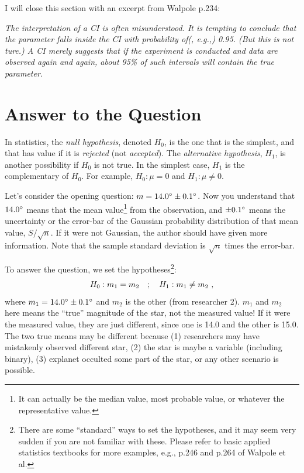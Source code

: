 I will close this section with an excerpt from Walpole p.234:

\textit{The interpretation of a CI is often misunderstood. It is tempting to conclude that the parameter falls inside the CI with probability of(, e.g.,) 0.95. (But this is not ture.) A CI merely suggests that if the experiment is conducted and data are observed again and again, about 95\% of such intervals will contain the true parameter.}



\section{Answer to the Question}
In statistics, the \textit{null hypothesis}, denoted $ H_0 $, is the one that is the simplest, and that has value if it is \textit{rejected} (not \textit{accepted}). The \textit{alternative hypothesis}, $ H_1 $, is another possibility if $ H_0 $ is not true. In the simplest case, $ H_1 $ is the complementary of $ H_0 $. For example, $ H_0: \mu = 0 $ and $ H_1: \mu \neq 0 $. 

Let's consider the opening question: $ m = \m{14.0} \pm \m{0.1} $. Now you understand that $ \m{14.0} $ means that the mean value\footnote{It can actually be the median value, most probable value, or whatever the representative value.} from the observation, and $ \pm \m{0.1} $ means the uncertainty or the error-bar of the Gaussian probability distribution of that mean value, $ S / \sqrt{n} $. If it were not Gaussian, the author should have given more information. Note that the sample standard deviation is $ \sqrt{n} $ times the error-bar.

To answer the question, we set the hypotheses\footnote{There are some ``standard'' ways to set the hypotheses, and it may seem very sudden if you are not familiar with these. Please refer to basic applied statistics textbooks for more examples, e.g., p.246 and p.264 of Walpole et al.}:
\begin{equation}
  H_0 : m_1 = m_2 
  \quad;\quad
  H_1 : m_1 \neq m_2 ~,
\end{equation}
where $ m_1 = \m{14.0} \pm \m{0.1} $ and $ m_2 $ is the other (from researcher 2). $ m_1 $ and $ m_2 $ here means the ``true'' magnitude of the star, not the measured value! If it were the measured value, they are just different, since one is 14.0 and the other is 15.0. The two true means may be different because (1) researchers may have mistakenly observed different star, (2) the star is maybe a variable (including binary), (3) explanet occulted some part of the star, or any other scenario is possible.

